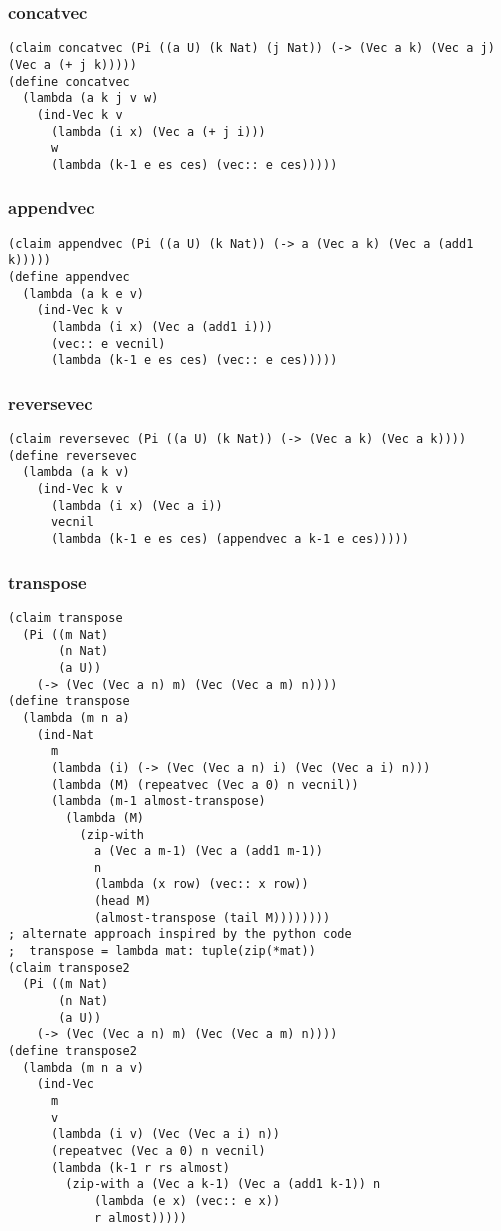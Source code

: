 \subsubsection{concatvec} \label{code:concatvec}
\begin{verbatim}
(claim concatvec (Pi ((a U) (k Nat) (j Nat)) (-> (Vec a k) (Vec a j) (Vec a (+ j k)))))
(define concatvec
  (lambda (a k j v w)
    (ind-Vec k v
      (lambda (i x) (Vec a (+ j i)))
      w
      (lambda (k-1 e es ces) (vec:: e ces)))))
\end{verbatim}

\subsubsection{appendvec} \label{code:appendvec}
\begin{verbatim}
(claim appendvec (Pi ((a U) (k Nat)) (-> a (Vec a k) (Vec a (add1 k)))))
(define appendvec
  (lambda (a k e v)
    (ind-Vec k v
      (lambda (i x) (Vec a (add1 i)))
      (vec:: e vecnil)
      (lambda (k-1 e es ces) (vec:: e ces)))))
\end{verbatim}

\subsubsection{reversevec} \label{code:reversevec}
\begin{verbatim}
(claim reversevec (Pi ((a U) (k Nat)) (-> (Vec a k) (Vec a k))))
(define reversevec
  (lambda (a k v)
    (ind-Vec k v
      (lambda (i x) (Vec a i))
      vecnil
      (lambda (k-1 e es ces) (appendvec a k-1 e ces)))))
\end{verbatim}

\subsubsection{transpose} \label{code:transpose}
\begin{verbatim}
(claim transpose
  (Pi ((m Nat)
       (n Nat)
       (a U))
    (-> (Vec (Vec a n) m) (Vec (Vec a m) n))))
(define transpose
  (lambda (m n a)
    (ind-Nat
      m
      (lambda (i) (-> (Vec (Vec a n) i) (Vec (Vec a i) n)))
      (lambda (M) (repeatvec (Vec a 0) n vecnil))
      (lambda (m-1 almost-transpose)
        (lambda (M)
          (zip-with
            a (Vec a m-1) (Vec a (add1 m-1))
            n
            (lambda (x row) (vec:: x row))
            (head M)
            (almost-transpose (tail M))))))))
; alternate approach inspired by the python code
;  transpose = lambda mat: tuple(zip(*mat))
(claim transpose2
  (Pi ((m Nat)
       (n Nat)
       (a U))
    (-> (Vec (Vec a n) m) (Vec (Vec a m) n))))
(define transpose2
  (lambda (m n a v)
    (ind-Vec
      m
      v
      (lambda (i v) (Vec (Vec a i) n))
      (repeatvec (Vec a 0) n vecnil)
      (lambda (k-1 r rs almost)
        (zip-with a (Vec a k-1) (Vec a (add1 k-1)) n 
            (lambda (e x) (vec:: e x)) 
            r almost)))))
\end{verbatim}



